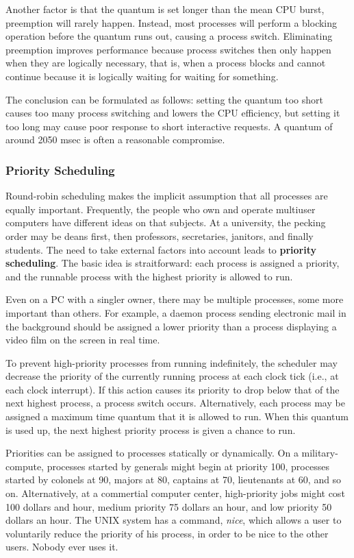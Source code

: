 \documentclass{book}
\newcommand {\kw}  [1] {\textbf{#1}}
\newcommand {\sys} [1] {\textsl{#1}}
\begin{document}
Another factor is that the quantum is set longer than the mean CPU burst, preemption will rarely happen. 
Instead, most processes will perform a blocking operation before the quantum runs out, causing a process switch.
Eliminating preemption improves performance because process switches then only happen when they are logically necessary, 
that is, when a process blocks and cannot continue because it is logically waiting for waiting for something.

The conclusion can be formulated as follows: setting the quantum too short causes too many process switching and lowers the CPU efficiency,
but setting it too long may cause poor response to short interactive requests.
A quantum of around 2050 msec is often a reasonable compromise.


\subsubsection*{Priority Scheduling}
Round-robin scheduling makes the implicit assumption that all processes are equally important.
Frequently, the people who own and operate multiuser computers have different ideas on that subjects.
At a university, the pecking order may be deans first, then professors, secretaries, janitors, and finally students.
The need to take external factors into account leads to \kw{priority scheduling}.
The basic idea is straitforward: each process is assigned a priority, 
and the runnable process with the highest priority is allowed to run.

Even on a PC with a singler owner, there may be multiple processes, some more important than others.
For example, a daemon process sending electronic mail in the background should be assigned a lower priority 
than a process displaying a video film on the screen in real time.

To prevent high-priority processes from running indefinitely, 
the scheduler may decrease the priority of the currently running process at each clock tick (i.e., at each clock interrupt).
If this action causes its priority to drop below that of the next highest process, a process switch occurs.
Alternatively, each process may be assigned a maximum time quantum that it is allowed to run.
When this quantum is used up, the next highest priority process is given a chance to run.

Priorities can be assigned to processes statically or dynamically.
On a military-compute, processes started by generals might begin at priority 100, 
processes started by colonels at 90, majors at 80, captains at 70, lieutenants at 60, and so on.
Alternatively, at a commertial computer center, high-priority jobs might cost 100 dollars and hour,
medium priority 75 dollars an hour, and low priority 50 dollars an hour.
The UNIX system has a command, \sys{nice}, which allows a user to voluntarily reduce the priority of his process,
in order to be nice to the other users.
Nobody ever uses it.
\end{document}
